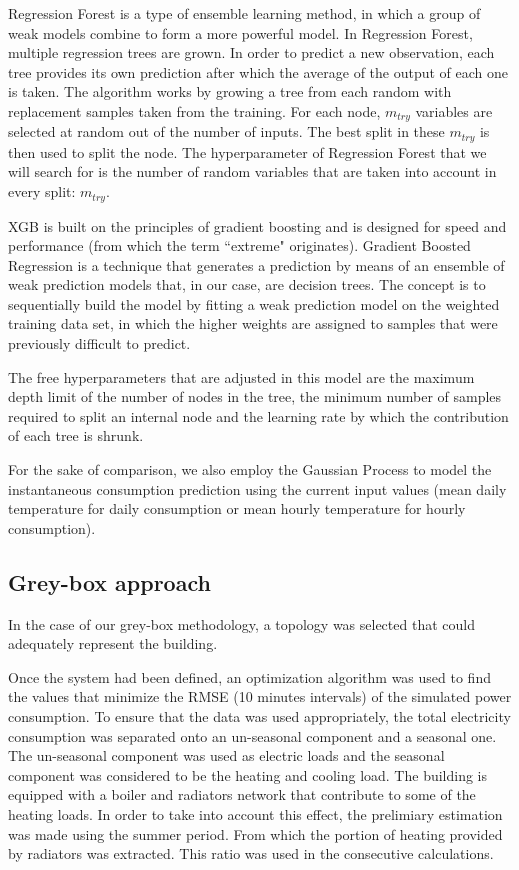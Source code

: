 \documentclass[10pt, conference, compsocconf]{IEEEtran}
\begin{document}
Regression Forest is a type of ensemble learning method, in which a group of weak models combine to form a more powerful model. In Regression Forest, multiple regression trees are grown. In order to predict a new observation, each tree provides its own prediction after which the average of the output of each one is taken. The algorithm works by growing a tree from each random with replacement samples taken from the training. For each node, $m_{try}$ variables are selected at random out of the number of inputs. The best split in these $m_{try}$ is then used to split the node. The hyperparameter of Regression Forest that we will search for is the number of random variables that are taken into account in every split: $m_{try}$. 


XGB is built on the principles of gradient boosting and is designed for speed and performance (from which the term ``extreme" originates).
Gradient Boosted Regression is a technique that generates a prediction by means of an ensemble of weak prediction models that, in our case, are decision trees. The concept is to sequentially build the model by fitting a weak prediction model on the weighted training data set, in which the higher weights are assigned to samples that were previously difficult to predict.

The free hyperparameters that are adjusted in this model are the maximum depth limit of the number of nodes in the tree, the minimum number of samples required to split an internal node and the learning rate by which the contribution of each tree is shrunk.

For the sake of comparison, we also employ the Gaussian Process to model the instantaneous consumption prediction using the current input values (mean daily temperature for daily consumption or mean hourly temperature for hourly consumption).


\subsection{Grey-box approach}

In the case of our grey-box methodology, a topology was selected that could adequately represent the building.


Once the system had been defined, an optimization algorithm was used to find the values that minimize the RMSE (10 minutes intervals) of the simulated power consumption. To ensure that the data was used appropriately, the total electricity consumption was separated onto an un-seasonal component and a seasonal one. The un-seasonal component was used as electric loads and the seasonal component was considered to be the heating and cooling load. The building is equipped with a boiler and radiators network that contribute to some of the heating loads. In order to take into account this effect, the prelimiary estimation was made using the summer period. From which the portion of heating provided by radiators was extracted. This ratio was used in the consecutive calculations.
\end{document}
